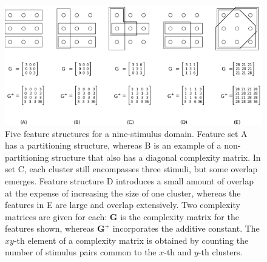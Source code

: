 \documentclass[doc,floatsintext]{apa6}
\newcommand{\mat}[1]{\mathbf{#1}}
\begin{document}
\begin{figure}[t]
\centering
\includegraphics[width=5.99in]{features.png}
\caption{Five feature structures for a nine-stimulus domain. Feature set A has a partit\-ion\-ing structure, whereas B is an example of a non-partitioning structure that also has a diagonal complexity matrix. In set C, each cluster still encompasses three stimuli, but some overlap emerges. Feature structure D introduces a small amount of overlap at the expense of increasing the size of one cluster, whereas the features in E are large and overlap extensively. Two complexity matrices are given for each: $\mat{G}$ is the complexity matrix for the features shown, whereas $\mat{G^{+}}$ incorporates the additive constant. The $xy$-th element of a complexity matrix is obtained by counting the number of stimulus pairs common to the $x$-th and $y$-th clusters.}
\label{fig:features}
\end{figure}
\end{document}
